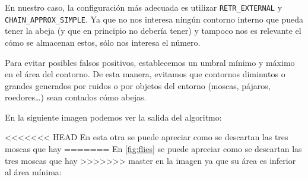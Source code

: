 En nuestro caso, la configuración más adecuada es utilizar
\texttt{RETR\_EXTERNAL} y \texttt{CHAIN\_APPROX\_SIMPLE}. Ya que no nos
interesa ningún contorno interno que pueda tener la abeja (y que en
principio no debería tener) y tampoco nos es relevante el cómo se
almacenan estos, sólo nos interesa el número.

Para evitar posibles falsos positivos, establecemos un umbral mínimo y
máximo en el área del contorno. De esta manera, evitamos que contornos
diminutos o grandes generados por ruidos o por objetos del entorno
(moscas, pájaros, roedores\ldots{}) sean contados cómo abejas.

En la siguiente imagen podemos ver la salida del algoritmo:


<<<<<<< HEAD
En esta otra se puede apreciar como se descartan las tres moscas que hay
=======
En \ref{fig:flies} se puede apreciar como se descartan las tres moscas que hay
>>>>>>> master
en la imagen ya que su área es inferior al área mínima:


